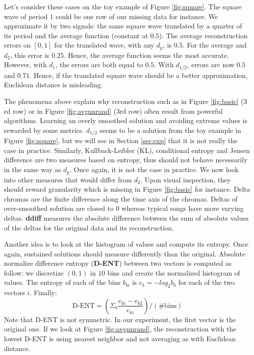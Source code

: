 \documentclass{article}
\begin{document}
Let's consider these cases on the toy example of Figure
\ref{fig:square}.  The square wave of period $1$ could be one row of
our missing data for instance.  We approximate it by two signals: the
same square wave translated by a quarter of its period and the average
function (constant at $0.5$). The average reconstruction errors on
$[0,1]$ for the translated wave, with any $d_p$, is $0.5$.  For the
average and $d_2$, this error is $0.25$.  Hence, the average function
seems the most accurate. However, with $d_1$, the errors are both
equal to $0.5$. With $d_{1/2}$, errors are now $0.5$ and
$0.71$. Hence, if the translated square wave should be a better
approximation, Euclidean distance is misleading.


The phenomena above explain why reconstruction such as in Figure
\ref{fig:basic} ($3$rd row) or in Figure \ref{fig:avgnnrand} ($3$rd
row) often result from powerful algorithms. Learning an overly
smoothed solution and avoiding extreme values is rewarded by some
metrics. $d_{1/2}$ seems to be a solution from the toy example in
Figure \ref{fig:square}, but we will see in Section \ref{sec:exp} that
it is not really the case in practice.  Similarly, Kullback-Leibler
(KL), conditional entropy and Jensen difference \cite{Michel1994} are
two measures based on entropy, thus should not behave necessarily in
the same way as $d_p$.  Once again, it is not the case in practice. We
now look into other measures that would differ from $d_2$.  Upon
visual inspection, they should reward granularity which is missing in
Figure \ref{fig:basic} for instance. Delta chromas are the finite
difference along the time axis of the chromas. Deltas of over-smoothed
solution are closed to $0$ whereas typical songs have more varying
deltas. \textbf{ddiff} measures the absolute difference between the
sum of absolute values of the deltas for the original data and its
reconstruction.

Another idea is to look at the histogram of values and compute its
entropy. Once again, sustained solutions should measure differently
than the original.  Absolute normalize difference entropy
(\textbf{D-ENT}) \cite{Mentzelopoulos2004} between two vectors is
computed as follow: we discretize $(0,1)$ in $10$ bins and create the
normalized histogram of values.  The entropy of each of the bins
$b_{bi}$ is $e_b = - log_2 b_b$ for each of the two vectors
$i$. Finally:
\[
\mbox{D-ENT} = \left( \Sigma_b \frac{e_{b1} - e_{b2}}{e_{b1}} \right) / (\mbox{\# bins})
\]
Note that D-ENT is not symmetric. In our experiment, the first vector
is the original one.  If we look at Figure \ref{fig:avgnnrand}, the
reconstruction with the lowest D-ENT is using nearest neighbor and not
averaging as with Euclidean distance.
\end{document}
